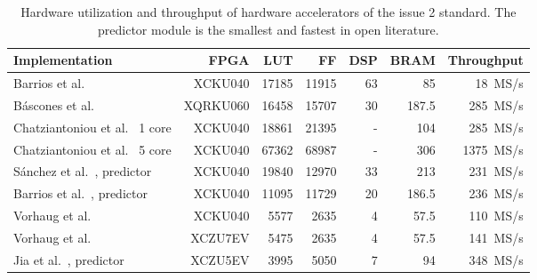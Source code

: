 \begin{table}[ht]
	\caption{Hardware utilization and throughput of hardware accelerators of the issue 2 standard. The predictor module is the smallest and fastest in open literature.}
	\label{tab:throughputs}
	\centering
	\begin{tabular}{l r r r r r r}
		\hline
		\textbf{Implementation}                                                                                      & \textbf{FPGA} & \textbf{LUT} & \textbf{FF} & \textbf{DSP} & \textbf{BRAM} & \textbf{Throughput} \\
		\hline
		Barrios et al.\ \cite{barriosHardwareImplementationCCSDS2021}                                                & XCKU040       & 17185        & 11915       & 63           & 85            & 18~MS/s             \\
		B\'ascones et al.\ \cite{basconesRealTimeFPGAImplementation2022}                                             & XQRKU060      & 16458        & 15707       & 30           & 187.5         & 285~MS/s            \\
		Chatziantoniou et al.\ \cite{chatziantoniouScalableDataRateNearLossless2022a} 1 core                         & XCKU040       & 18861        & 21395       & -            & 104           & 285~MS/s            \\
		Chatziantoniou et al.\ \cite{chatziantoniouScalableDataRateNearLossless2022a} 5 core                         & XCKU040       & 67362        & 68987       & -            & 306           & 1375~MS/s           \\
		S\'anchez et al.\ \cite{sanchezReducingDataDependencies2022, barriosRemovingDataDependencies2024}, predictor & XCKU040       & 19840        & 12970       & 33           & 213           & 231~MS/s            \\
		Barrios et al.\ \cite{barriosRemovingDataDependencies2024}, predictor                                        & XCKU040       & 11095        & 11729       & 20           & 186.5         & 236~MS/s            \\
		Vorhaug et al.\ \cite{vorhaugHyperspectralImageCompression2024}                                              & XCKU040       & 5577         & 2635        & 4            & 57.5          & 110~MS/s            \\
		Vorhaug et al.\ \cite{vorhaugHyperspectralImageCompression2024}                                              & XCZU7EV       & 5475         & 2635        & 4            & 57.5          & 141~MS/s            \\
		Jia et al.\ \cite{jiaRemovalFeedbackLoop2025}, predictor                                                     & XCZU5EV       & 3995         & 5050        & 7            & 94            & 348~MS/s            \\
		\hline
	\end{tabular}
\end{table}

